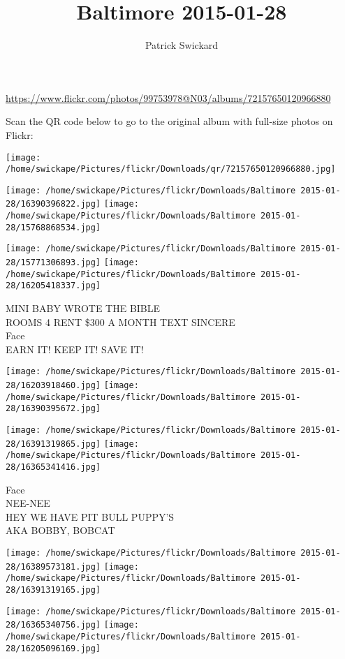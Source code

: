 \documentclass[10pt,letterpaper]{article}
\title{Baltimore 2015-01-28}
\author{Patrick Swickard}
\date{}
\begin{document}
\maketitle

\url{https://www.flickr.com/photos/99753978@N03/albums/72157650120966880}

Scan the QR code below to go to the original album with full-size photos on Flickr:

\texttt{[image: /home/swickape/Pictures/flickr/Downloads/qr/72157650120966880.jpg]}
\pagebreak

\texttt{[image: /home/swickape/Pictures/flickr/Downloads/Baltimore 2015-01-28/16390396822.jpg]}
\texttt{[image: /home/swickape/Pictures/flickr/Downloads/Baltimore 2015-01-28/15768868534.jpg]}

\texttt{[image: /home/swickape/Pictures/flickr/Downloads/Baltimore 2015-01-28/15771306893.jpg]}
\texttt{[image: /home/swickape/Pictures/flickr/Downloads/Baltimore 2015-01-28/16205418337.jpg]}

MINI BABY WROTE THE BIBLE\\
ROOMS 4 RENT \$300 A MONTH TEXT SINCERE\\
Face\\
EARN IT!  KEEP IT!  SAVE IT!
\pagebreak

\texttt{[image: /home/swickape/Pictures/flickr/Downloads/Baltimore 2015-01-28/16203918460.jpg]}
\texttt{[image: /home/swickape/Pictures/flickr/Downloads/Baltimore 2015-01-28/16390395672.jpg]}

\texttt{[image: /home/swickape/Pictures/flickr/Downloads/Baltimore 2015-01-28/16391319865.jpg]}
\texttt{[image: /home/swickape/Pictures/flickr/Downloads/Baltimore 2015-01-28/16365341416.jpg]}

Face\\
NEE{-}NEE\\
HEY WE HAVE PIT BULL PUPPY'S\\
AKA BOBBY, BOBCAT
\pagebreak

\texttt{[image: /home/swickape/Pictures/flickr/Downloads/Baltimore 2015-01-28/16389573181.jpg]}
\texttt{[image: /home/swickape/Pictures/flickr/Downloads/Baltimore 2015-01-28/16391319165.jpg]}

\texttt{[image: /home/swickape/Pictures/flickr/Downloads/Baltimore 2015-01-28/16365340756.jpg]}
\texttt{[image: /home/swickape/Pictures/flickr/Downloads/Baltimore 2015-01-28/16205096169.jpg]}
\end{document}
